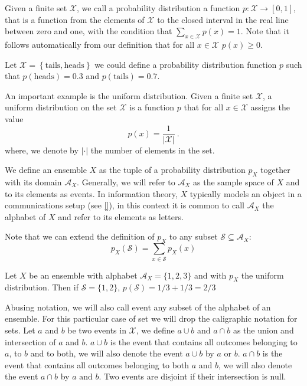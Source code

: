 Given a finite set $\mathcal X$, we call a probability distribution a function $p:\mathcal X\rightarrow[0,1]$, that is a function from the elements of $\mathcal X$ to the closed interval in the real line between zero and one, with the condition that $\sum_{x\in\mathcal X}p(x)=1$. 
Note that it follows automatically from our definition that for all $x\in\mathcal X$ $p(x)\geq 0$. 
\begin{example} Let $\mathcal X =\left\{\text{tails},\text{heads}\right\}$ we could define a probability distribution function $p$ such that $p(\text{heads})=0.3$ and $p(\text{tails})=0.7$.
\end{example}
\begin{example} An important example is the uniform distribution. Given a finite set $\mathcal X$, a uniform distribution on the set $\mathcal X$ is a function $p$ that for all $x\in\mathcal X$ assigns the value $$p(x)=\frac{1}{|\mathcal{X}|}\ .$$ where, we denote by $|\cdot|$ the number of elements in the set.
\end{example}
We define an ensemble $X$ as the tuple of a probability distribution $p_X$ together with its domain $\mathcal A_X$. 
Generally, we will refer to $\mathcal A_X$ as the sample space of $X$ and to its elements as events. %
In information theory, $X$ typically models an object in a communications setup (see \ref{}), in this context it is common to call $\mathcal A_X$ the alphabet of $X$ and refer to its elements as letters. %

Note that we can extend the definition of $p_X$ to any subset $\mathcal{S}\subseteq \mathcal{A}_X$:
\begin{equation}
p_X(\mathcal{S})=\sum_{x\in \mathcal{S}}p_X(x)
\end{equation} 
\begin{example}
Let $X$ be an ensemble with alphabet $\mathcal A_X=\{1,2,3\}$ and with $p_X$ the uniform distribution. Then if $\mathcal S=\{1,2\}$, $p(\mathcal S)=1/3+1/3=2/3$ 
\end{example}
Abusing notation, we will also call event any subset of the alphabet of an ensemble. For this particular case of set we will drop the caligraphic notation for sets.
Let $a$ and $b$ be two events in $\mathcal{X}$, we define $a\cup b$ and $a\cap b$ as the union and intersection of $a$ and $b$. 
$a\cup b$ is the event that contains all outcomes belonging to $a$, to $b$ and to both, we will also denote the event $a\cup b$ by $a \text{ or } b$. 
$a\cap b$ is the event that contains all outcomes belonging to both $a$ and $b$, we will also denote the event $a\cap b$ by $a \text{ and } b$. Two events are disjoint if their intersection is null.


